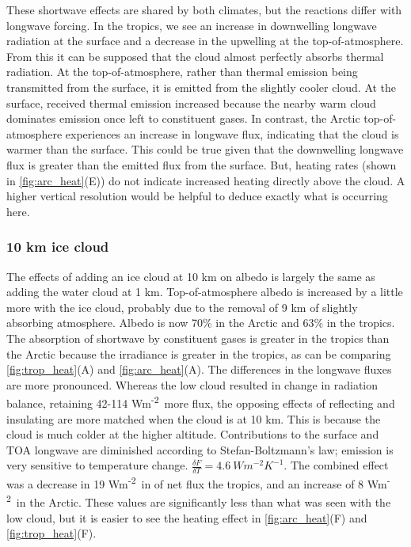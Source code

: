 \documentclass[twocol]{ametsoc}
\newcommand{\FU}{Wm\textsuperscript{-2}}
\begin{document}
These shortwave effects are shared by both climates, but the reactions differ with longwave forcing. In the tropics, we see an increase in downwelling longwave radiation at the surface and a decrease in the upwelling at the top-of-atmosphere. From this it can be supposed that the cloud almost perfectly absorbs thermal radiation. At the top-of-atmosphere, rather than thermal emission being transmitted from the surface, it is emitted from the slightly cooler cloud. At the surface, received thermal emission increased because the nearby warm cloud dominates emission once left to constituent gases. In contrast, the Arctic top-of-atmosphere experiences an increase in longwave flux, indicating that the cloud is warmer than the surface. This could be true given that the downwelling longwave flux is greater than the emitted flux from the surface. But, heating rates (shown in \autoref{fig:arc_heat}(E)) do not indicate increased heating directly above the cloud. A higher vertical resolution would be helpful to deduce exactly what is occurring here.

\subsubsection{10 km ice cloud}
The effects of adding an ice cloud at 10 km on albedo is largely the same as adding the water cloud at 1 km. Top-of-atmosphere albedo is increased by a little more with the ice cloud, probably due to the removal of 9 km of slightly absorbing atmosphere. Albedo is now 70\% in the Arctic and 63\% in the tropics. The absorption of shortwave by constituent gases is greater in the tropics than the Arctic because the irradiance is greater in the tropics, as can be comparing \autoref{fig:trop_heat}(A) and \autoref{fig:arc_heat}(A). The differences in the longwave fluxes are more pronounced. Whereas the low cloud resulted in change in radiation balance, retaining 42-114 \FU~more flux, the opposing effects of reflecting and insulating are more matched when the cloud is at 10 km.  This is because the cloud is much colder at the higher altitude. Contributions to the surface and TOA longwave are diminished according to Stefan-Boltzmann's law; emission is very sensitive to temperature change. $\frac{\delta F}{\delta T} = 4.6~W m^{-2}K^{-1}$. The combined effect was a decrease in 19 \FU~in of net flux the tropics, and an increase of 8 \FU~in the Arctic. These values are significantly less than what was seen with the low cloud, but it is easier to see the heating effect in \autoref{fig:arc_heat}(F) and \autoref{fig:trop_heat}(F).
\end{document}
